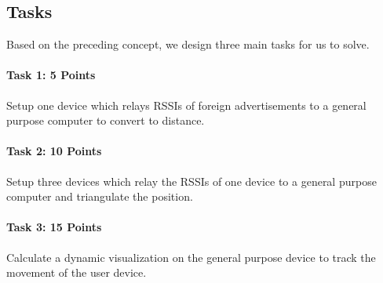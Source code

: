 \subsection{Tasks}
Based on the preceding concept, we design three main tasks for us to solve.

\paragraph{Task 1: 5 Points}
Setup one device which relays RSSIs of foreign advertisements to a general purpose computer to convert to distance.

\paragraph{Task 2: 10 Points}
Setup three devices which relay the RSSIs of one device to a general purpose computer and triangulate the position.

\paragraph{Task 3: 15 Points}
Calculate a dynamic visualization on the general purpose device to track the movement of the user device.

